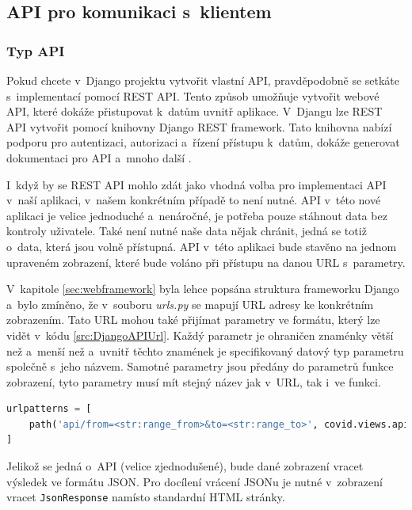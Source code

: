 \subsection{API pro komunikaci s~klientem}

\subsubsection*{Typ API}

Pokud chcete v~Django projektu vytvořit vlastní API, pravděpodobně se setkáte s~implementací pomocí REST API. Tento způsob umožňuje vytvořit webové API, které dokáže přistupovat k~datům uvnitř aplikace. V~Djangu lze REST API vytvořit pomocí knihovny Django REST framework. Tato knihovna nabízí podporu pro autentizaci, autorizaci a~řízení přístupu k~datům, dokáže generovat dokumentaci pro API a~mnoho další \cite{rest-api}.

I~když by se REST API mohlo zdát jako vhodná volba pro implementaci API v~naší aplikaci, v~našem konkrétním případě to není nutné. API v~této nové aplikaci je velice jednoduché a~nenáročné, je potřeba pouze stáhnout data bez kontroly uživatele. Také není nutné naše data nějak chránit, jedná se totiž o~data, která jsou volně přístupná. API v~této aplikaci bude stavěno na jednom upraveném zobrazení, které bude voláno při přístupu na danou URL s~parametry.

V~kapitole \ref{sec:webframework} byla lehce popsána struktura frameworku Django a~bylo zmíněno, že v~souboru \emph{urls.py} se mapují URL adresy ke konkrétním zobrazením. Tato URL mohou také přijímat parametry ve formátu, který lze vidět v~kódu \ref{src:DjangoAPIUrl}. Každý parametr je ohraničen znaménky větší než a~menší než a~uvnitř těchto znamének je specifikovaný datový typ parametru společně s~jeho názvem. Samotné parametry jsou předány do parametrů funkce zobrazení, tyto parametry musí mít stejný název jak v~URL, tak i~ve funkci. 

\begin{lstlisting}[language=Python,label=src:DjangoAPIUrl,caption={Mapování URL k API}]
urlpatterns = [
    path('api/from=<str:range_from>&to=<str:range_to>', covid.views.api, name='api')
]
\end{lstlisting}

Jelikož se jedná o~API (velice zjednodušené), bude dané zobrazení vracet výsledek ve formátu JSON. Pro docílení vrácení JSONu je nutné v~zobrazení vracet \lstinline{JsonResponse} namísto standardní HTML stránky.

